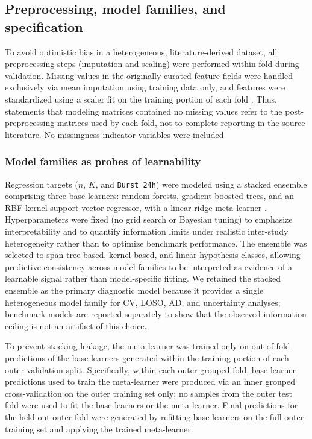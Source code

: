 \documentclass[preprint,12pt,authoryear]{elsarticle}
\begin{document}
\subsection{Preprocessing, model families, and specification}
To avoid optimistic bias in a heterogeneous, literature-derived dataset, all preprocessing steps (imputation and scaling) were performed within-fold during validation. Missing values in the originally curated feature fields were handled exclusively via mean imputation using training data only, and features were standardized using a scaler fit on the training portion of each fold \citep{Pedregosa2011Sklearn}. Thus, statements that modeling matrices contained no missing values refer to the post-preprocessing matrices used by each fold, not to complete reporting in the source literature. No missingness-indicator variables were included.

\subsubsection{Model families as probes of learnability}
Regression targets ($n$, $K$, and \texttt{Burst\_24h}) were modeled using a stacked ensemble comprising three base learners: random forests, gradient-boosted trees, and an RBF-kernel support vector regressor, with a linear ridge meta-learner \citep{Breiman2001RF, CortesVapnik1995SVM, HoerlKennard1970Ridge, Wolpert1992Stacked, Chen2016XGBoost}. Hyperparameters were fixed (no grid search or Bayesian tuning) to emphasize interpretability and to quantify information limits under realistic inter-study heterogeneity rather than to optimize benchmark performance. The ensemble was selected to span tree-based, kernel-based, and linear hypothesis classes, allowing predictive consistency across model families to be interpreted as evidence of a learnable signal rather than model-specific fitting. We retained the stacked ensemble as the primary diagnostic model because it provides a single heterogeneous model family for CV, LOSO, AD, and uncertainty analyses; benchmark models are reported separately to show that the observed information ceiling is not an artifact of this choice.

To prevent stacking leakage, the meta-learner was trained only on out-of-fold predictions of the base learners generated within the training portion of each outer validation split. Specifically, within each outer grouped fold, base-learner predictions used to train the meta-learner were produced via an inner grouped cross-validation on the outer training set only; no samples from the outer test fold were used to fit the base learners or the meta-learner. Final predictions for the held-out outer fold were generated by refitting base learners on the full outer-training set and applying the trained meta-learner.
\end{document}
